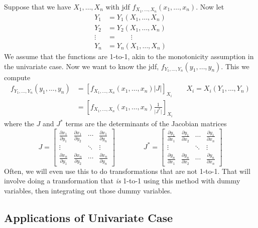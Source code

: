 \documentclass[a4paper,12pt]{scrartcl}
\begin{document}
Suppose that we have $X_1, \ldots, X_n$ with jdf $f_{X_1, \ldots, X_n}(
x_1, \ldots, x_n)$. Now let 
\begin{align*}
   Y_1 &= Y_1(X_1, \ldots, X_n) \\
   Y_2 &= Y_2(X_1, \ldots, X_n)\\
   \vdots &= \qquad \vdots\\
   Y_n &= Y_n(X_1, \ldots, X_n)
\end{align*}
We assume that the functions are 1-to-1, akin to the monotonicity
assumption in the univariate case. Now we want to know the 
jdf, $f_{Y_1, \ldots, Y_n}(y_1, \ldots, y_n)$. This we compute
\begin{align*}
   f_{Y_1, \ldots, Y_n}(y_1, \ldots, y_n) &= \left[
      f_{X_1, \ldots, X_n}(x_1, \ldots, x_n) \lvert J \rvert 
      \right]_{X_i}
      \qquad X_i = X_i(Y_1, \ldots, Y_n)\\
   &= \left[
      f_{X_1, \ldots, X_n}(x_1, \ldots, x_n)\frac{1}{\lvert J^*\rvert}
      \right]_{X_i}
\end{align*}
where the $J$ and $J^*$ terms are the determinants of the Jacobian
matrices
\begin{equation}
   J = \begin{bmatrix} \frac{\partial x_1}{\partial y_1} &
      \frac{\partial x_1}{\partial y_2} & \cdots & 
      \frac{\partial x_1}{\partial y_n} \\
      \vdots & & \ddots & \vdots \\
      \frac{\partial x_n}{\partial y_1} & 
      \frac{\partial x_n}{\partial y_2} & \cdots &
      \frac{\partial x_n}{\partial y_n}  
   \end{bmatrix} \qquad \qquad
   J^* = \begin{bmatrix} \frac{\partial y_1}{\partial x_1} &
      \frac{\partial y_1}{\partial x_2} & \cdots & 
      \frac{\partial y_1}{\partial x_n} \\
      \vdots & & \ddots & \vdots \\
      \frac{\partial y_n}{\partial x_1} & 
      \frac{\partial y_n}{\partial x_2} & \cdots &
      \frac{\partial y_n}{\partial x_n}  
   \end{bmatrix}
\end{equation}
Often, we will even use this to do transformations that are not
1-to-1. That will involve doing a transformation that \emph{is}
1-to-1 using this method with dummy variables, then integrating
out those dummy variables.




\newpage
\subsection{Applications of Univariate Case}
\end{document}
